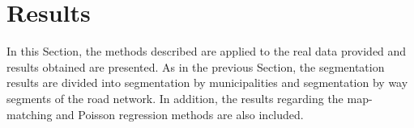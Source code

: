 \chapter{Results} \label{ch:results}
In this Section, the methods described are applied to the real data provided and results obtained are presented. As in the previous Section, the segmentation results are divided into segmentation by municipalities and segmentation by way segments of the road network. In addition, the results regarding the map-matching and Poisson regression methods are also included.

